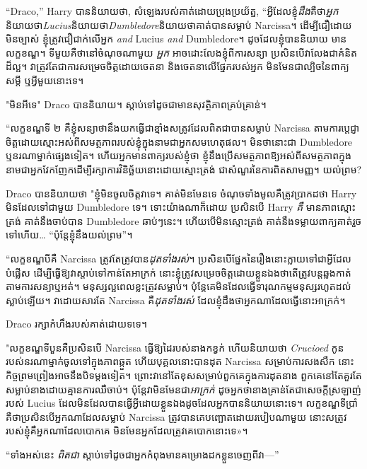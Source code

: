 {{{{{{{{“Draco,” Harry បាននិយាយថា, សំឡេងរបស់គាត់ដោយប្រុងប្រយ័ត្ន, “អ្វីដែលខ្ញុំ\emph{ដឹង}គឺថា\emph{អ្នក}និយាយថា\emph{Lucius}និយាយថា\emph{Dumbledore}និយាយថាគាត់បានសម្លាប់ Narcissa។ ដើម្បី​ជឿ​ដោយ​មិន​ច្បាស់ ខ្ញុំ​ត្រូវ​ជឿជាក់​លើ​អ្នក \emph{and} Lucius \emph{and} Dumbledore។ ដូច​ដែល​ខ្ញុំ​បាន​និយាយ មាន​លក្ខខណ្ឌ។ ទីមួយគឺថានៅចំណុចណាមួយ \emph{អ្នក} អាចដោះលែងខ្ញុំពីការសន្យា ប្រសិនបើវាលែងជាគំនិតដ៏ល្អ។ វាត្រូវតែជាការសម្រេចចិត្តដោយចេតនា និងចេតនាលើផ្នែករបស់អ្នក មិនមែនជាល្បិចនៃពាក្យសម្ដី ឬអ្វីមួយនោះទេ។

"មិនអីទេ" Draco បាននិយាយ។ ស្តាប់ទៅដូចជាមានសុវត្ថិភាពគ្រប់គ្រាន់។

“លក្ខខណ្ឌទី ២ គឺខ្ញុំសន្យាថានឹងយកធ្វើជាខ្មាំងសត្រូវដែលពិតជាបានសម្លាប់ Narcissa តាមការប្តេជ្ញាចិត្តដោយស្មោះអស់ពីសមត្ថភាពរបស់ខ្ញុំក្នុងនាមជាអ្នកសមហេតុផល។ មិនថានោះជា Dumbledore ឬនរណាម្នាក់ផ្សេងទៀត។ ហើយ​អ្នក​មាន​ពាក្យ​របស់​ខ្ញុំ​ថា ខ្ញុំ​នឹង​ប្រើ​សមត្ថភាព​ឱ្យ​អស់​ពី​សមត្ថភាព​ក្នុង​នាម​ជា​អ្នក​វែកញែក​ដើម្បី​រក្សា​ការ​វិនិច្ឆ័យ​នោះ​ដោយ​ស្មោះត្រង់ ជា​សំណួរ​នៃ​ការពិត​សាមញ្ញ។ យល់ព្រម?

Draco បាននិយាយថា "ខ្ញុំមិនចូលចិត្តវាទេ។ គាត់មិនមែនទេ ចំណុចទាំងមូលគឺត្រូវប្រាកដថា Harry មិនដែលទៅជាមួយ Dumbledore ទេ។ ទោះយ៉ាងណាក៏ដោយ ប្រសិនបើ Harry \emph{គឺ} មានភាពស្មោះត្រង់ គាត់នឹងចាប់បាន Dumbledore ឆាប់ៗនេះ។ ហើយ​បើ​មិន​ស្មោះត្រង់ គាត់​នឹង​ទម្លាយ​ពាក្យ​គាត់​រួច​ទៅ​ហើយ… “ប៉ុន្តែ​ខ្ញុំ​នឹង​យល់ព្រម”។

“លក្ខខណ្ឌបីគឺ Narcissa ត្រូវតែត្រូវបាន\emph{ដុតទាំងរស់}។ ប្រសិនបើផ្នែកនៃរឿងនោះក្លាយទៅជាអ្វីដែលបំផ្លើស ដើម្បីធ្វើឱ្យវាស្តាប់ទៅកាន់តែអាក្រក់ នោះខ្ញុំត្រូវសម្រេចចិត្តដោយខ្លួនឯងថាតើត្រូវបន្តឆ្លងកាត់តាមការសន្យាឬអត់។ មនុស្សល្អពេលខ្លះត្រូវសម្លាប់។ ប៉ុន្តែ​គេ​មិន​ដែល​ធ្វើ​ទារុណកម្ម​មនុស្ស​រហូត​ដល់​ស្លាប់​ឡើយ។ វាដោយសារតែ Narcissa គឺ\emph{ដុតទាំងរស់} ដែលខ្ញុំដឹងថាអ្នកណាដែលធ្វើនោះអាក្រក់។

Draco រក្សា​កំហឹង​របស់គាត់​ដោយ​ទទេ។

"លក្ខខណ្ឌទីបួនគឺប្រសិនបើ Narcissa ធ្វើឱ្យដៃរបស់នាងកខ្វក់ ហើយនិយាយថា \emph{Crucioed} កូនរបស់នរណាម្នាក់ចូលទៅក្នុងភាពឆ្កួត ហើយបុគ្គលនោះបានដុត Narcissa សម្រាប់ការសងសឹក នោះកិច្ចព្រមព្រៀងអាចនឹងបិទម្តងទៀត។ ព្រោះវានៅតែខុសសម្រាប់ពួកគេក្នុងការដុតនាង ពួកគេនៅតែគួរតែសម្លាប់នាងដោយគ្មានការឈឺចាប់។ ប៉ុន្តែវាមិនមែនជា\emph{អាក្រក់} ដូចអ្នកថានាងគ្រាន់តែជាសេចក្តីស្រឡាញ់របស់ Lucius ដែលមិនដែលបានធ្វើអ្វីដោយខ្លួនឯងដូចដែលអ្នកបាននិយាយនោះទេ។ លក្ខខណ្ឌ​ទី​ប្រាំ​គឺ​ថា​ប្រសិន​បើ​អ្នក​ណា​ដែល​សម្លាប់ Narcissa ត្រូវ​បាន​គេ​បញ្ឆោត​ដោយ​របៀប​ណា​មួយ នោះ​សត្រូវ​របស់​ខ្ញុំ​គឺ​អ្នក​ណា​ដែល​បោក​គេ មិន​មែន​អ្នក​ដែល​ត្រូវ​គេ​បោក​នោះ​ទេ»។

“ទាំងអស់នេះ \emph{ពិតជា} ស្តាប់ទៅដូចជាអ្នកកំពុងមានគម្រោងដកខ្លួនចេញពីវា—”

}}}}}}}}

